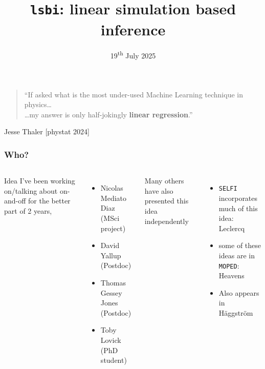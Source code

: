 \documentclass[aspectratio=169]{beamer}
\title{\texttt{lsbi}: linear simulation based inference }
\subtitle{\arxiv{2501.03921}}
\date{19\textsuperscript{th} July 2025}
\begin{document}
\begin{frame}
    \titlepage
\end{frame}

\begin{frame}
    \begin{quote}
        ``If asked what is the most under-used Machine Learning technique in physics\ldots\\ \hfill\ldots my answer is only half-jokingly \textbf{linear regression}.''\hspace{20pt} 
    \end{quote}

    \hfill Jesse Thaler [phystat 2024]
\end{frame}

\begin{frame}
    \frametitle{Who?}
    \begin{columns}
        Idea I've been working on/talking about on-and-off for the better part of 2 years,
        \begin{itemize}
            \item Nicolas Mediato Diaz (MSci project)
            \item David Yallup (Postdoc)
            \item Thomas Gessey Jones (Postdoc)
            \item Toby Lovick (PhD student)
        \end{itemize}

        Many others have also presented this idea independently
        \begin{itemize}
            \item \texttt{SELFI} incorporates much of this idea: Leclercq~
            \item some of these ideas are in \texttt{MOPED}: Heavens~
            \item Also appears in Häggström~
        \end{itemize}


\end{columns}
\end{frame}
\end{document}
